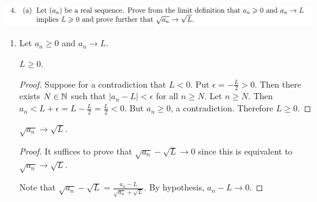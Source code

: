 \documentclass[12pt]{article}
\begin{document}
\subsection{}
\begin{mdframed}
\includegraphics[width=400pt]{img/oxford-M2-analysis-I-4-4-a.png}
\end{mdframed}
\begin{enumerate}[label=(\alph*)]
\item Let $a_n \geq 0$ and $a_n \to L$.
  \begin{claim*}
    $L \geq 0$.
  \end{claim*}
  \begin{proof}
    Suppose for a contradiction that $L < 0$. Put $\epsilon = -\frac{L}{2} > 0$. Then there exists
    $N \in \mathbb{N}$ such that $|a_n - L| < \epsilon$ for all $n \geq N$. Let $n \geq N$. Then
    $a_n < L + \epsilon = L - \frac{L}{2} = \frac{L}{2} < 0$. But $a_n \geq 0$, a
    contradiction. Therefore $L \geq 0$.
  \end{proof}

  \begin{claim*}
    $\sqrt{a_n} \to \sqrt{L}$.
  \end{claim*}
  \begin{proof}
    It suffices to prove that $\sqrt{a_n} - \sqrt{L} \to 0$ since this is equivalent to
    $\sqrt{a_n} \to \sqrt{L}$.

    Note that $\sqrt{a_n} - \sqrt{L} = \frac{a_n - L}{\sqrt{a_n} + \sqrt{L}}$. By hypothesis, $a_n - L \to 0$.
\end{proof}

\end{enumerate}
\end{document}
